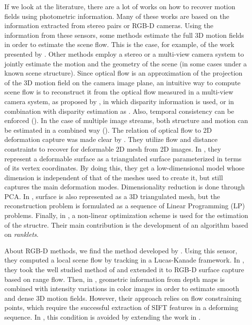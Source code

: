 If we look at the literature, there are a lot of works on how to recover motion fields using photometric information. Many of these works are based on the information extracted from stereo  pairs or RGB-D cameras. Using the information from these sensors, some methods estimate the full 3D motion fields in order to estimate the scene flow. This is the case, for example, of the work presented by \cite{vedula1999three}. Other methods employ a stereo or a multi-view camera system to jointly estimate the motion and the geometry of the scene (in some cases under a known scene structure). Since optical flow is an approximation of the projection of the 3D motion field on the camera image plane, an intuitive way to compute scene flow is to reconstruct it from the optical flow measured in a multi-view camera system, as proposed by \cite{vedula2005three}, in which disparity information is used, or in combination with disparity estimation as \cite{huguet2007variational, li2008multi, zhang20013d}. Also, temporal consistency can be enforced (\cite{rabe2010dense}). In the case of multiple image streams, both structure and motion can be estimated in a combined way (\cite{pons2007multi, basha2013multi}). The relation of optical flow to 2D deformation capture was made clear by \cite{hilsmann2007deformable}. They utilize flow and distance constraints to recover for deformable 2D mesh from 2D images. In \cite{salzmann2007surface}, they represent a deformable surface as a triangulated surface parameterized in terms of its vertex coordinates. By doing this, they get a low-dimensional model whose dimension is independent of that of the meshes used to create it, but still captures the main deformation modes. Dimensionality reduction is done through \ac{PCA}. In \cite{wang2010monocular}, surface is also represented as a 3D triangulated mesh, but the reconstruction problem is formulated as a sequence of Linear Programming (LP) problems. Finally, in \cite{delbue2007nonrigid}, a non-linear optimization scheme is used for the estimation of the structre. Their main contribution is the development of an algorithm based on \emph{ranklets}.

About RGB-D methods, we find the method developed by \cite{quiroga2014local}. Using this sensor, they computed a local scene flow by tracking in a Lucas-Kanade framework. In \cite{spies2000dense}, they took the well studied method of \cite{horn1981determining} and extended it to RGB-D surface capture based on range flow. Then, in \cite{petit2011surface, letouzey2011scene}, geometric information from depth maps is combined with intensity variations in color images in order to estimate smooth and dense 3D motion fields. However, their approach relies on flow constraining points, which require the successful extraction of SIFT features in a deforming sequence. In \cite{birdal2012monocular}, this condition is avoided by extending the work in \cite{spies2000dense}. 

